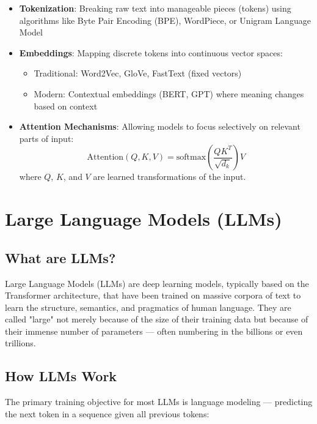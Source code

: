 \documentclass[openany]{book}
\begin{document}
\begin{itemize}
    \item \textbf{Tokenization}: Breaking raw text into manageable pieces 
    (tokens) using algorithms like Byte Pair Encoding (BPE), WordPiece, or 
    Unigram Language Model
    
    \item \textbf{Embeddings}: Mapping discrete tokens into continuous vector 
    spaces:
    \begin{itemize}
        \item Traditional: Word2Vec, GloVe, FastText (fixed vectors)
        \item Modern: Contextual embeddings (BERT, GPT) where meaning changes 
        based on context
    \end{itemize}
    
    \item \textbf{Attention Mechanisms}: Allowing models to focus selectively 
    on relevant parts of input:
    \begin{equation}
        \text{Attention}(Q, K, V) = 
        \text{softmax}\left(\frac{QK^T}{\sqrt{d_k}}\right)V
    \end{equation}
    where $Q$, $K$, and $V$ are learned transformations of the input.
\end{itemize}

\section{Large Language Models (LLMs)}

\subsection{What are LLMs?}
Large Language Models (LLMs) are deep learning models, typically based on the 
Transformer architecture, that have been trained on massive corpora of text to 
learn the structure, semantics, and pragmatics of human language. They are 
called "large" not merely because of the size of their training data but because 
of their immense number of parameters — often numbering in the billions or even 
trillions.

\subsection{How LLMs Work}
The primary training objective for most LLMs is language modeling — predicting 
the next token in a sequence given all previous tokens:
\end{document}
